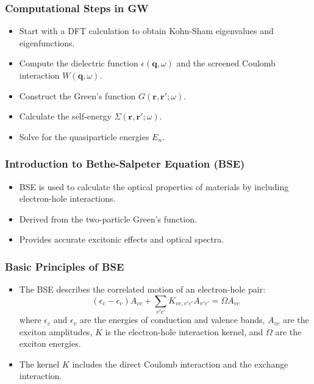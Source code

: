 \documentclass{CustomBeamer}
\begin{document}
        \begin{frame}
        \frametitle{Computational Steps in GW}
        \begin{itemize}
            \item Start with a DFT calculation to obtain Kohn-Sham eigenvalues and eigenfunctions.
            \item Compute the dielectric function $\epsilon(\mathbf{q}, \omega)$ and the screened Coulomb interaction $W(\mathbf{q}, \omega)$.
            \item Construct the Green's function $G(\mathbf{r}, \mathbf{r}'; \omega)$.
            \item Calculate the self-energy $\Sigma(\mathbf{r}, \mathbf{r}'; \omega)$.
            \item Solve for the quasiparticle energies $E_n$.
        \end{itemize}
        \end{frame}
        
        \begin{frame}
        \frametitle{Introduction to Bethe-Salpeter Equation (BSE)}
        \begin{itemize}
            \item BSE is used to calculate the optical properties of materials by including electron-hole interactions.
            \item Derived from the two-particle Green's function.
            \item Provides accurate excitonic effects and optical spectra.
        \end{itemize}
        \end{frame}
        
        \begin{frame}
        \frametitle{Basic Principles of BSE}
        \begin{itemize}
            \item The BSE describes the correlated motion of an electron-hole pair:
            \begin{equation}
            (\epsilon_c - \epsilon_v) A_{vc} + \sum_{v'c'} K_{vc,v'c'} A_{v'c'} = \Omega A_{vc}
            \end{equation}
            where $\epsilon_c$ and $\epsilon_v$ are the energies of conduction and valence bands, $A_{vc}$ are the exciton amplitudes, $K$ is the electron-hole interaction kernel, and $\Omega$ are the exciton energies.
            \item The kernel $K$ includes the direct Coulomb interaction and the exchange interaction.
        \end{itemize}
        \end{frame}
        
\end{document}
